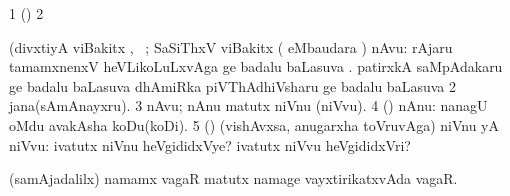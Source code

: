 \bentry
{} 
\gl{\saMkiSx}
\expl{}
\bmng
{} 
\emng
\eentry

\bentry
{} 
\gl{\saMkiSx}
\expl{}
\bmng
\bnum
\num{1} (\birx)  
\num{2}  
\enum
\emng
\eentry

\bentry
{} 
\gl{\sanA}
\expl{}
\bmng
(divxtiyA viBakitx  \AtAmx, \pArxparx\ ; SaSiThxV viBakitx  
\bnum
{} ( eMbaudara \bava) nAvu: 
\banum
{}  rAjaru tamamxnenxV heVLikoLuLxvAga  ge badalu baLasuva . 
  patirxkA saMpAdakaru  ge badalu baLasuva  
  dhAmiRka piVThAdhiVsharu  ge badalu baLasuva  
\eanum
\numie
\num{2} jana(sAmAnayxru). 
\num{3} nAvu; nAnu matutx niVnu (niVvu). 
\num{4} (\AmA) nAnu:  nanagU oMdu avakAsha koDu(koDi). 
\num{5} (\AmA) (vishAvxsa, anugarxha toVruvAga) niVnu yA niVvu:  ivatutx niVnu heVgididxVye? ivatutx niVvu heVgididxVri? 
\enum
\emng

\noindent 
\gl{\pagu}
\expl{}
\bmng
{} (samAjadalilx) namamx vagaR matutx namage vayxtirikatxvAda vagaR. 
\emng
\eentry

\bentry
{}
\gl{\saMkiSx}
\expl{}
\bmng
{} 
\emng
\eentry

